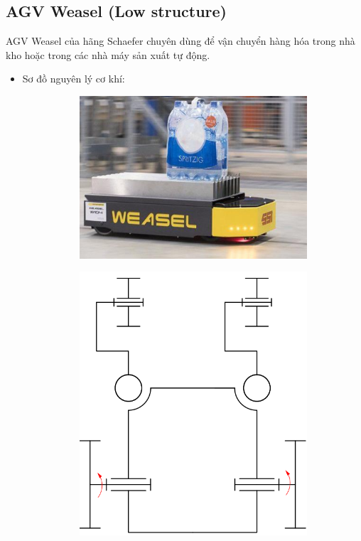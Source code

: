     \subsection{AGV Weasel (Low structure)}
        \hspace*{0.6cm} AGV Weasel của hãng Schaefer chuyên dùng để vận chuyển hàng hóa trong nhà kho hoặc trong các nhà máy sản xuất tự động.
        \begin{itemize}
            \item Sơ đồ nguyên lý cơ khí:
            \begin{figure}[H]
                \begin{subfigure}{0.5\textwidth}
                \centering
                \includegraphics[width=0.6\linewidth, right]{pictures/chapter1/chapter1_pic12a_weasle.png} 
                \label{chap1_pic12a}
                \end{subfigure}
                \begin{subfigure}{0.7\textwidth}
                \includegraphics[width=0.55\linewidth]{pictures/chapter1/chapter1_pic12b_newbie.png}
                \label{chap1_pic12b}
                \end{subfigure}

\end{figure}
\end{itemize}
